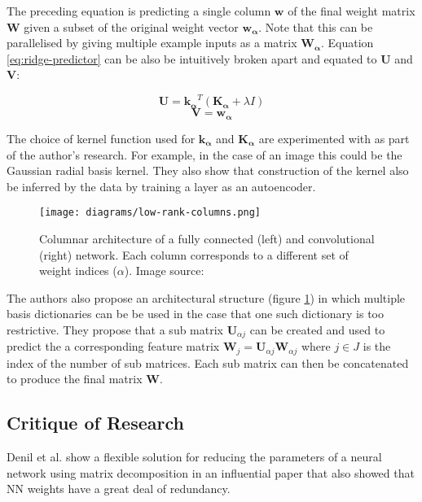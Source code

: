 \documentclass[journal]{IEEEtran}
\begin{document}
The preceding equation is predicting a single column $\bm{w}$ of the final weight matrix $\bm{W}$ given a subset of the original weight vector $\bm{w_\alpha}$. Note that this can be parallelised by giving multiple example inputs as a matrix $\bm{W_\alpha}$. Equation \ref{eq:ridge-predictor} can be also be intuitively broken apart and equated to $\bm{U}$ and $\bm{V}$:

\begin{equation}
	\bm{U} = \bm{k_\alpha}^T(\bm{K_\alpha} + \lambda I)
\end{equation}
\begin{equation}
	\bm{V} = \bm{w_\alpha}
\end{equation}

The choice of kernel function used for $\bm{k_\alpha}$ and $\bm{K_\alpha}$ are experimented with as part of the author's research. For example, in the case of an image this could be the Gaussian radial basis kernel. They also show that construction of the kernel also be inferred by the data by training a layer as an autoencoder. 

\begin{figure}[h!]
\centering
\texttt{[image: diagrams/low-rank-columns.png]}
\caption{Columnar architecture of a fully connected (left) and convolutional (right) network. Each column corresponds to a different set of weight indices ($\alpha$). Image source: \cite{denil2013predicting}}
\label{fig:low-rank-columns}
\end{figure}

The authors also propose an architectural structure (figure \ref{fig:low-rank-columns}) in which multiple basis dictionaries can be be used in the case that one such dictionary is too restrictive. They propose that a sub matrix $\bm{U}_{\alpha j}$ can be created and used to predict the a corresponding feature matrix $\bm{W}_j = \bm{U}_{\alpha j} \bm{W}_{\alpha j}$ where $j \in J$ is the index of the number of sub matrices. Each sub matrix can then be concatenated to produce the final matrix $\bm{W}$.

\subsection{Critique of Research}
Denil et al. \cite{denil2013predicting} show a flexible solution for reducing the parameters of a neural network using matrix decomposition in an influential paper that also showed that NN weights have a great deal of redundancy.
\end{document}
